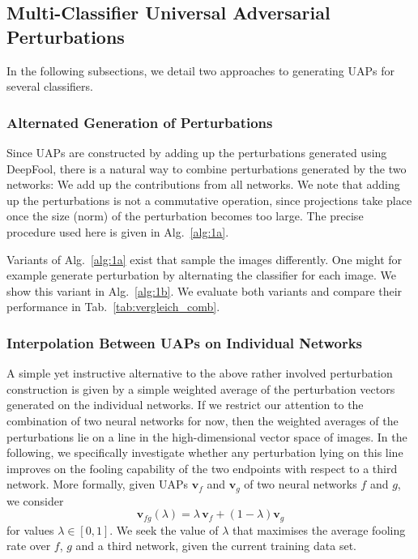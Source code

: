 \documentclass[runningheads]{llncs}
\begin{document}
\subsection{Multi-Classifier Universal Adversarial Perturbations}\label{sec:MultUAP}

In the following subsections, we detail two approaches to generating UAPs for several classifiers.

\subsubsection{Alternated Generation of Perturbations}
Since UAPs are constructed by adding up the perturbations generated using DeepFool, there is a natural way to combine perturbations generated by the two networks: We add up the contributions from all networks. We note that adding up the perturbations is not a commutative operation, since projections take place once the size (norm) of the perturbation becomes too large. The precise procedure used here is given in Alg.~\ref{alg:1a}. 

Variants of Alg.~\ref{alg:1a} exist that sample the images differently. One might for example generate perturbation by alternating the classifier for each image. We show this variant in Alg.~\ref{alg:1b}. We evaluate both variants and compare their performance in Tab.~\ref{tab:vergleich_comb}. 
 
\subsubsection{Interpolation Between UAPs on Individual Networks}
A simple yet instructive alternative to the above rather involved perturbation construction is given by a simple weighted average of the perturbation vectors generated on the individual networks. If we restrict our attention to the combination of two neural networks for now, then the weighted averages of the perturbations lie on a line in the high-dimensional vector space of images. In the following, we specifically investigate whether any perturbation lying on this line improves on the fooling capability of the two endpoints with respect to a third network.
More formally, given UAPs \(\mathbf{v}_f\) and \(\mathbf{v}_g\) of two neural networks $f$ and $g$, we consider \begin{equation}\label{eq:interp}
\mathbf{v}_{fg}\left(\lambda\right)=\lambda\,\mathbf{v}_f+\left(1-\lambda\right)\mathbf{v}_g
\end{equation}	
for values \(\lambda\in\left[0,1\right]\). We seek the value of $\lambda$ that maximises the average fooling rate over $f$, $g$ and a third network, given the current training data set.
\end{document}
